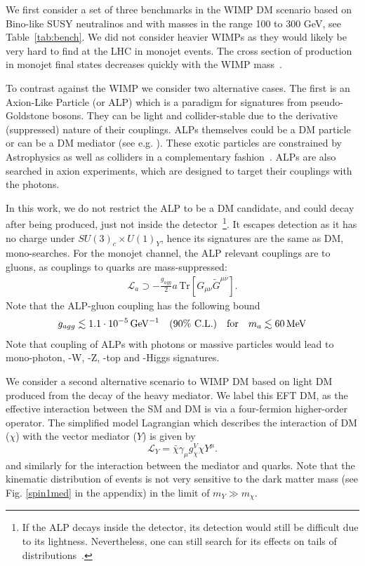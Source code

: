 \documentclass[prd,aps,letterpaper,floatfix,superscriptaddress,preprintnumbers,twocolumn,10pt,nofootinbib]{revtex4-1}
\newcommand{\be}{\begin{equation}}
\newcommand{\ee}{\end{equation}}
\newcommand{\cl}{\%\,\,  \text{C.L.}}
\begin{document}
We first consider a set of three benchmarks in the WIMP DM scenario based on Bino-like SUSY neutralinos and with masses in the range 100 to 300 GeV, see Table~\ref{tab:bench}. We did not consider heavier WIMPs as they would likely be very hard to find at the LHC in monojet events. The cross section of production in monojet final states decreases quickly with the WIMP mass~\cite{Barducci:2015ffa}. 



To contrast against the WIMP we consider two alternative cases. The first is an Axion-Like Particle (or ALP) which is a paradigm for signatures from pseudo-Goldstone bosons. They can be light and collider-stable due to the derivative (suppressed) nature of their couplings. ALPs themselves could be a DM particle or can be a  DM mediator (see e.g. \cite{Lee:2012ph}). These exotic particles are constrained by Astrophysics as well as colliders in a complementary fashion~\cite{Mimasu:2014nea}. ALPs are also searched in axion experiments, which are designed to target their couplings with the photons. 

In this work, we do not restrict the ALP to be a DM candidate, and could decay after being produced, just not inside the detector~\footnote{If the ALP decays inside the detector, its detection would still be difficult due to its lightness. Nevertheless, one can still search for its effects on tails of distributions~\cite{Gavela:2019cmq}.}. It escapes detection as it has no charge under $SU(3)_c\times U(1)_Y$, hence its signatures are the same as DM, mono-searches. For the monojet channel, the  ALP relevant couplings are to gluons, as couplings to quarks are mass-suppressed: 
\begin{align}\label{eqn:L_eff}
    \mathcal{L}_a \supset 
 - \frac{g_{agg}}{2}a\,\text{Tr}\left[G_{\mu\nu}\tilde{G}^{\mu\nu}\right] . 
\end{align}
Note that the ALP-gluon coupling has the following bound \cite{Mimasu:2014nea,Brivio:2017ije}
\be g_{agg} \lesssim \unit[1.1\cdot10^{-5}]{GeV^{-1}} \quad (90\cl) \quad \text{for}\quad m_a \lesssim \unit[60]{MeV}\ee
Note that coupling of ALPs with photons or massive particles would lead to mono-photon, -W, -Z, -top and -Higgs signatures. 

We consider a second alternative scenario to WIMP DM based on light DM produced from the decay of the heavy mediator. We label this EFT DM, as the effective interaction between the SM and DM is via a four-fermion higher-order operator. The  simplified model Lagrangian which describes the interaction of DM ($\chi$) with the vector mediator ($Y$) is given by
\be  \mathcal{L}_{Y} =  \bar\chi \gamma_\mu g^V_{\chi} \chi Y^{\mu}.\ee and similarly for the interaction between the mediator and quarks. 
Note that the kinematic distribution of events is not very sensitive to the dark matter mass (see Fig. \ref{spin1med} in the appendix) in the limit of $m_Y \gg m_\chi$.  
\end{document}
